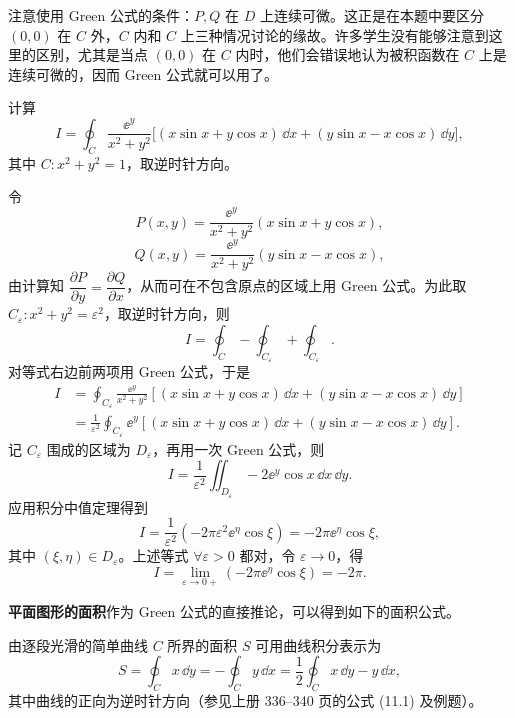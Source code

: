 \begin{xremark}
注意使用 Green 公式的条件：$P,Q$ 在 $D$ 上连续可微。这正是在本题中要区分 $(0,0)$ 在 $C$ 外，$C$ 内和 $C$ 上三种情况讨论的缘故。许多学生没有能够注意到这里的区别，尤其是当点 $(0,0)$ 在 $C$ 内时，他们会错误地认为被积函数在 $C$ 上是连续可微的，因而 Green 公式就可以用了。
\end{xremark}

\begin{xexample}[24.3.3]
计算
\[
  I=\oint_C\frac{\ee^y}{x^2+y^2}\bigl[(x\sin x+y\cos x)\,\dd x+(y\sin x-x\cos x)\,\dd y\bigr],
\]
其中 $C\colon x^2+y^2=1$，取逆时针方向。
\end{xexample}
\begin{xsolution}
令
\[
  P(x,y)=\frac{\ee^y}{x^2+y^2}(x\sin x+y\cos x),
\]
\[
  Q(x,y)=\frac{\ee^y}{x^2+y^2}(y\sin x-x\cos x),
\]
由计算知 $\dfrac{\partial P}{\partial y}=\dfrac{\partial Q}{\partial x}$，从而可在不包含原点的区域上用 Green 公式。为此取 $C_\varepsilon\colon x^2+y^2=\varepsilon^2$，取逆时针方向，则
\[
  I=\oint_C-\oint_{C_\varepsilon}+\oint_{C_\varepsilon}.
\]
对等式右边前两项用 Green 公式，于是
\begin{align*}
  I&=\oint_{C_\varepsilon}\frac{\ee^y}{x^2+y^2}[(x\sin x+y\cos x)\,\dd x+(y\sin x-x\cos x)\,\dd y]\\
   &=\frac1{\varepsilon^2}\oint_{C_\varepsilon}\ee^y[(x\sin x+y\cos x)\,\dd x+(y\sin x-x\cos x)\,\dd y].
\end{align*}
记 $C_\varepsilon$ 围成的区域为 $D_\varepsilon$，再用一次 Green 公式，则
\[
  I=\frac1{\varepsilon^2}\iint_{D_\varepsilon}-2\ee^y\cos x\,\dd x\,\dd y.
\]
应用积分中值定理得到
\[
  I=\frac1{\varepsilon^2}(-2\pi\varepsilon^2\ee^\eta\cos\xi)
  =-2\pi\ee^\eta\cos\xi,
\]
其中 $(\xi,\eta)\in D_\varepsilon$。上述等式 $\forall\varepsilon>0$ 都对，令 $\varepsilon\to0$，得
\[
  I=\lim_{\varepsilon\to0+}(-2\pi\ee^\eta\cos\xi)=-2\pi.
\]
\end{xsolution}

\textbf{平面图形的面积}\quad 作为 Green 公式的直接推论，可以得到如下的面积公式。

由逐段光滑的简单曲线 $C$ 所界的面积 $S$ 可用曲线积分表示为
\[
  S=\oint_Cx\,\dd y=-\oint_Cy\,\dd x=\frac12\oint_Cx\,\dd y-y\,\dd x,
\]
其中曲线的正向为逆时针方向（参见上册 336--340 页的公式 (11.1) 及例题）。

